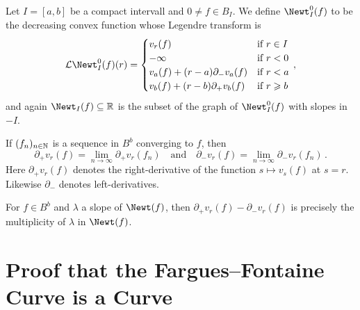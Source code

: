 \documentclass[a4paper, 10pt, oneside, DIV=9, chapterprefix=true, numbers=enddot,bibliography=totoc]{scrbook}
\begin{document}
\begin{defi}
	Let $I=[a,b]$ be a compact intervall and $0\neq f\in B_I$. We define $\Newt_I^0(f)$ to be the decreasing convex function whose Legendre transform is
	\begin{equation*}
		\Ll\Newt_I^0(f)(r)=\begin{cases}
		v_r(f) & \text{if }r\in I\\
		-\infty & \text{if }r<0\\
		v_a(f)+(r-a)\partial_-v_a(f) & \text{if }r<a\\
		v_b(f)+(r-b)\partial_+v_b(f) & \text{if }r\geq b
		\end{cases}\,,
	\end{equation*}
	and again $\Newt_I(f)\subseteq \IR$ is the subset of the graph of $\Newt_I^0(f)$ with slopes in $-I$.
\end{defi}
\begin{rem}
	\begin{numerate}
		\item If $(f_n)_{n\in\mathbb{N}}$ is a sequence in $B^b$ converging to $f$, then
		\begin{equation*}
			\partial_+v_r(f)=\lim_{n\to\infty}\partial_+v_r(f_n)\quad\text{and}\quad\partial_-v_r(f)=\lim_{n\to\infty}\partial_-v_r(f_n)\,.
		\end{equation*}
		Here $\partial_+v_r(f)$ denotes the right-derivative of the function $s\mapsto v_s(f)$ at $s=r$. Likewise $\partial_-$ denotes left-derivatives.
		\item For $f\in B^b$ and $\lambda$ a slope of $\Newt(f)$, then $\partial_+v_r(f)-\partial_-v_r(f)$ is precisely the multiplicity of $\lambda$ in $\Newt(f)$.
	\end{numerate}
\end{rem}
\section{Proof that the Fargues--Fontaine Curve is a Curve}
\end{document}
